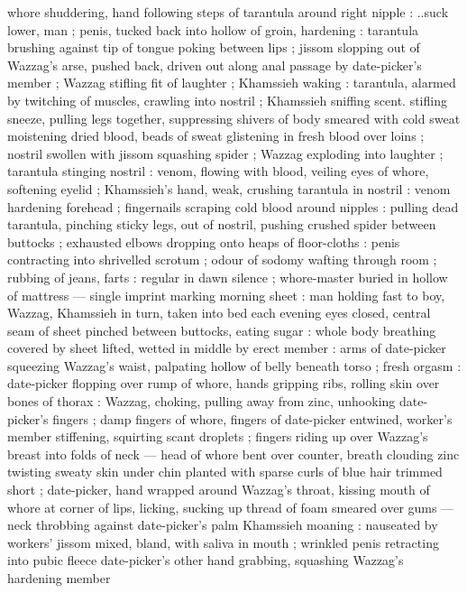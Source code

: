 whore shuddering, hand following steps of tarantula around right 
nipple : {\gl} ..suck lower, man{\td} {\gr} ; penis, tucked back into hollow of 
groin, hardening : tarantula brushing against tip of tongue poking 
between lips ; jissom slopping out of Wazzag's arse, pushed back, 
driven out along anal passage by date-picker's member ; Wazzag 
stifling fit of laughter ; Khamssieh waking : tarantula, alarmed by 
twitching of muscles, crawling into nostril ; Khamssieh sniffing scent. 
stifling sneeze, pulling legs together, suppressing shivers of body 
smeared with cold sweat moistening dried blood, beads of sweat 
glistening in fresh blood over loins ; nostril swollen with jissom 
squashing spider ; Wazzag exploding into laughter ; tarantula 
stinging nostril : venom, flowing with blood, veiling eyes of whore, 
softening eyelid ; Khamssieh's hand, weak, crushing tarantula in 
nostril : venom hardening forehead ; fingernails scraping cold blood 
around nipples : pulling dead tarantula, pinching sticky legs, out of nostril, pushing crushed
spider between buttocks ; exhausted elbows dropping onto heaps of floor-cloths : penis contracting
into shrivelled scrotum ; odour of sodomy wafting through room ; rubbing of jeans, farts : regular
in dawn silence ; whore-master buried in hollow of mattress --- single imprint marking morning sheet
: man holding fast to boy, Wazzag, Khamssieh in turn, taken into bed each evening {\dashcom} eyes
closed, central seam of sheet pinched between buttocks, eating sugar : whole body breathing covered
by sheet lifted, wetted in middle by erect member : arms of date-picker squeezing Wazzag's waist,
palpating hollow of belly beneath torso ; fresh orgasm : date-picker flopping over rump of whore,
hands gripping ribs, rolling skin over bones of thorax : Wazzag, choking, pulling away from zinc,
unhooking date-picker's fingers ; damp fingers of whore, fingers of date-picker entwined, worker's
member stiffening, squirting scant droplets ; fingers riding up over Wazzag's breast into folds of
neck --- head of whore bent over counter, breath clouding zinc {\dashcom} twisting sweaty skin under
chin planted with sparse curls of blue hair trimmed short ; date-picker, hand wrapped around
Wazzag's throat, kissing mouth of whore at corner of lips, licking, sucking up thread of foam
smeared over gums --- neck throbbing against date-picker's palm {\slashsemi} Khamssieh moaning :
nauseated by workers' jissom mixed, bland, with saliva in mouth ; wrinkled penis retracting into
pubic fleece {\slashsemi} date-picker's other hand grabbing, squashing Wazzag's hardening member
